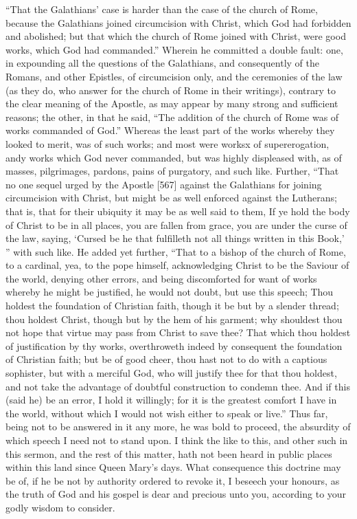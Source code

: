 “That the Galathians’ case is harder than the case of the church of Rome, because the Galathians joined circumcision with Christ, which God had forbidden and abolished; but that which the church of Rome joined with Christ, were good works, which God had commanded.” Wherein he committed a double fault: one, in expounding all the questions of the Galathians, and consequently of the Romans, and other Epistles, of circumcision only, and the ceremonies of the law (as they do, who answer for the church of Rome in their writings), contrary to the clear meaning of the Apostle, as may appear by many strong and sufficient reasons; the other, in that he said, “The addition of the church of Rome was of works commanded of God.” Whereas the least part of the works whereby they looked to merit, was of such works; and most were worksx of supererogation, andy works which God never commanded, but was highly displeased with, as of masses, pilgrimages, pardons, pains of purgatory, and such like. Further, “That no one sequel urged by the Apostle [567] against the Galathians for joining circumcision with Christ, but might be as well enforced against the Lutherans; that is, that for their ubiquity it may be as well said to them, If ye hold the body of Christ to be in all places, you are fallen from grace, you are under the curse of the law, saying, ‘Cursed be he that fulfilleth not all things written in this Book,’ ” with such like. He added yet further, “That to a bishop of the church of Rome, to a cardinal, yea, to the pope himself, acknowledging Christ to be the Saviour of the world, denying other errors, and being discomforted for want of works whereby he might be justified, he would not doubt, but use this speech; Thou holdest the foundation of Christian faith, though it be but by a slender thread; thou holdest Christ, though but by the hem of his garment; why shouldest thou not hope that virtue may pass from Christ to save thee? That which thou holdest of justification by thy works, overthroweth indeed by consequent the foundation of Christian faith; but be of good cheer, thou hast not to do with a captious sophister, but with a merciful God, who will justify thee for that thou holdest, and not take the advantage of doubtful construction to condemn thee. And if this (said he) be an error, I hold it willingly; for it is the greatest comfort I have in the world, without which I would not wish either to speak or live.” Thus far, being not to be answered in it any more, he was bold to proceed, the absurdity of which speech I need not to stand upon. I think the like to this, and other such in this sermon, and the rest of this matter, hath not been heard in public places within this land since Queen Mary’s days. What consequence this doctrine may be of, if he be not by authority ordered to revoke it, I beseech your honours, as the truth of God and his gospel is dear and precious unto you, according to your godly wisdom to consider.


